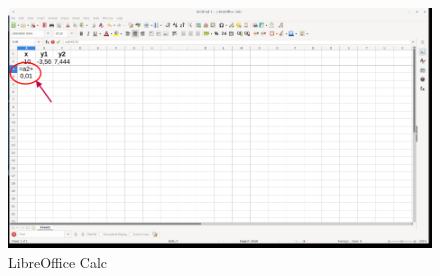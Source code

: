 \begin{figure}[h!]		
	\centering
   	\includegraphics[width=8.0in]{pictures/picture_008.png}
  	\caption{LibreOffice Calc}
   	\label{fig:LibreOfficeCalc008}
\end{figure}